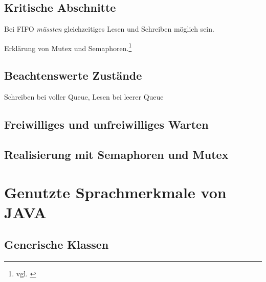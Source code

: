 
\subsection{Kritische Abschnitte} %
\label{sub:kritische_abschnitte}

Bei \ac{FIFO} \textit{müssten} gleichzeitiges Lesen und Schreiben möglich sein.

Erklärung von Mutex und Semaphoren.\footnote{vgl. \cite{oscon}}


\subsection{Beachtenswerte Zustände} %
\label{sub:beachtenswerte_zustande}

Schreiben bei voller Queue, Lesen bei leerer Queue


\subsection{Freiwilliges und unfreiwilliges Warten} %
\label{sub:freiwilliges_und_unfreiwilliges_warten}


\subsection{Realisierung mit Semaphoren und Mutex} %
\label{sub:realisierung_mit_semaphoren_und_mutex}



\newpage
\section{Genutzte Sprachmerkmale von JAVA} %
\label{sec:genutzte_sprachmerkmale_von_java}

\subsection{Generische Klassen} %
\label{sub:generics}


